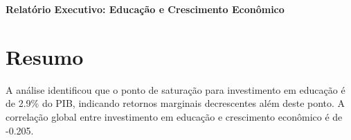 \documentclass[12pt]{article}
\begin{document}
\begin{center}
    \LARGE\textbf{Relatório Executivo: Educação e Crescimento Econômico}
\end{center}

\section*{Resumo}
A análise identificou que o ponto de saturação para investimento em educação é de 2.9\% do PIB, indicando retornos marginais decrescentes além deste ponto. A correlação global entre investimento em educação e crescimento econômico é de -0.205.
\end{document}
